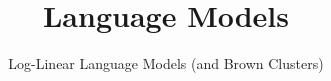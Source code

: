 \documentclass[compress]{beamer}
\title{Language Models}
\date{Log-Linear Language Models (and Brown Clusters)}
\begin{document}
\frame{\titlepage
}
\end{document}

